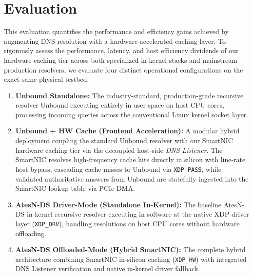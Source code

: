 \documentclass[a4paper,fleqn,colorlinks,hidelinks]{cas-sc}
\begin{document}
\section{Evaluation}
\label{sec:evaluation}
This evaluation quantifies the performance and efficiency gains achieved by augmenting DNS resolution with a hardware-accelerated caching layer. To rigorously assess the performance, latency, and host efficiency dividends of our hardware caching tier across both specialized in-kernel stacks and mainstream production resolvers, we evaluate four distinct operational configurations on the exact same physical testbed:
\begin{enumerate}
    \item \textbf{Unbound Standalone:} The industry-standard, production-grade recursive resolver Unbound executing entirely in user space on host CPU cores, processing incoming queries across the conventional Linux kernel socket layer.
    \item \textbf{Unbound + HW Cache (Frontend Acceleration):} A modular hybrid deployment coupling the standard Unbound resolver with our SmartNIC hardware caching tier via the decoupled host-side \textit{DNS Listener}. The SmartNIC resolves high-frequency cache hits directly in silicon with line-rate host bypass, cascading cache misses to Unbound via \texttt{XDP\_PASS}, while validated authoritative answers from Unbound are statefully ingested into the SmartNIC lookup table via PCIe DMA.
    \item \textbf{AtesN-DS Driver-Mode (Standalone In-Kernel):} The baseline AtesN-DS in-kernel recursive resolver executing in software at the native XDP driver layer (\texttt{XDP\_DRV}), handling resolutions on host CPU cores without hardware offloading.
    \item \textbf{AtesN-DS Offloaded-Mode (Hybrid SmartNIC):} The complete hybrid architecture combining SmartNIC in-silicon caching (\texttt{XDP\_HW}) with integrated DNS Listener verification and native in-kernel driver fallback.
\end{enumerate}
\end{document}
